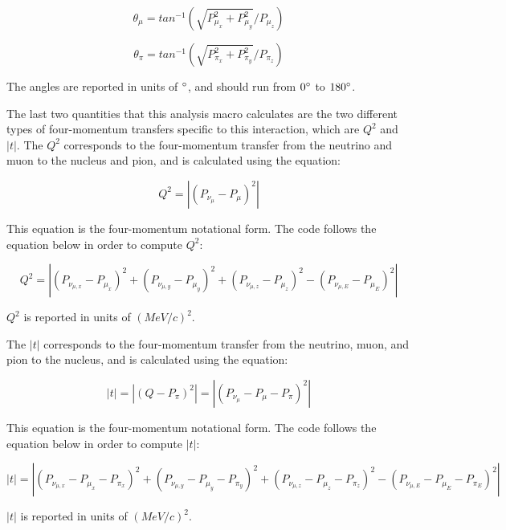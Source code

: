 \documentclass[11pt]{article}
\begin{document}
\begin{equation}
\theta_\mu = tan^{-1}(\sqrt{P_{\mu_x}^2 + P_{\mu_y}^2}/{P_{\mu_z}})
\end{equation}

\begin{equation}
\theta_\pi = tan^{-1}(\sqrt{P_{\pi_x}^2 + P_{\pi_y}^2}/{P_{\pi_z}})
\end{equation}

\noindent
The angles are reported in units of $\degree$, and should run from $0\degree$ to $180\degree$.

The last two quantities that this analysis macro calculates are the two different types of four-momentum transfers specific to this interaction, which are $Q^2$ and $|t|$. The $Q^2$ corresponds to the four-momentum transfer from the neutrino and muon to the nucleus and pion, and is calculated using the equation:

\begin{equation}
Q^2 = |(P_{\nu_\mu} - P_\mu)^2|
\end{equation}

\noindent
This equation is the four-momentum notational form. The code follows the equation below in order to compute $Q^2$:

\begin{equation}
Q^2 = |(P_{\nu_{\mu,x}} - P_{\mu_x})^2 + (P_{\nu_{\mu,y}} - P_{\mu_y})^2 + (P_{\nu_{\mu,z}} - P_{\mu_z})^2 - (P_{\nu_{\mu,E}} - P_{\mu_E})^2|
\end{equation}

\noindent
$Q^2$ is reported in units of $(MeV/c)^2$.

The $|t|$ corresponds to the four-momentum transfer from the neutrino, muon, and pion to the nucleus, and is calculated using the equation:

\begin{equation}
|t| = |(Q - P_\pi)^2| = |(P_{\nu_\mu} - P_\mu - P_\pi)^2|
\end{equation}

\noindent
This equation is the four-momentum notational form. The code follows the equation below in order to compute $|t|$:

\begin{equation}
|t| = |(P_{\nu_{\mu,x}} - P_{\mu_x} - P_{\pi_x})^2 + (P_{\nu_{\mu,y}} - P_{\mu_y} - P_{\pi_y})^2 + (P_{\nu_{\mu,z}} - P_{\mu_z} - P_{\pi_z})^2 - (P_{\nu_{\mu,E}} - P_{\mu_E} - P_{\pi_E})^2|
\end{equation}

\noindent
$|t|$ is reported in units of $(MeV/c)^2$.
\end{document}
